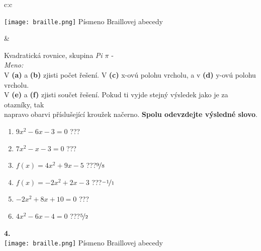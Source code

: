 \documentclass[10pt]{report}
\begin{document}
\begin{tabular}{c:c}
\begin{minipage}[c][99mm][t]{0.49\linewidth}
\begin{center}
\begin{minipage}{0.20\linewidth}
\begin{center}
\texttt{[image: braille.png]}
{\small Písmeno Braillovej abecedy}
\end{center}
\end{minipage}
\end{center}
\end{minipage}
&
\begin{minipage}[c][99mm][t]{0.49\linewidth}
\begin{center}
\vspace{7mm}
{\huge Kvadratická rovnice, skupina \textit{Pi $\pi$} -}\\[4.5mm]
\textit{Meno:}\phantom{xxxxxxxxxxxxxxxxxxxxxxxxxxxxxxxxxxxxxxxxxxxxxxxxxxxxxxxxxxxxxxxxx}\\[3.5mm]
V \textbf{(a)} a \textbf{(b)} zjisti počet řešení. V \textbf{(c)} x-ovú polohu vrcholu, a v \textbf{(d)} y-ovú polohu vrcholu.\\V \textbf{(e)} a \textbf{(f)} zjisti součet řešení. Pokud ti vyjde stejný výsledek jako je za otazníky, tak\\napravo obarvi příslušející kroužek načerno. \textbf{Spolu odevzdejte výsledné slovo}.\\[3mm]
\begin{minipage}{0.77\linewidth}
\begin{center}
\begin{varwidth}{\textwidth}
\begin{enumerate}
\large
\item $9x^2-6x-3=0$\quad \dotfill\; ???\;\dotfill {}
\item $7x^2-x-3=0$\quad \dotfill\; ???\;\dotfill {}
\item $f(x)=4x^2+9x-5$\quad \dotfill\; ???\;\dotfill \quad $\nicefrac{9}{8}$
\item $f(x)=-2x^2+2x-3$\quad \dotfill\; ???\;\dotfill \quad $\nicefrac{-1}{1}$
\item $-2x^2+8x+10=0$\quad \dotfill\; ???\;\dotfill {}
\item $4x^2-6x-4=0$\quad \dotfill\; ???\;\dotfill \quad $\nicefrac{5}{2}$
\end{enumerate}
\end{varwidth}
\end{center}
\end{minipage}
\begin{minipage}{0.20\linewidth}
\begin{center}
{\Huge\bfseries 4.} \\[2mm]
\texttt{[image: braille.png]}
{\small Písmeno Braillovej abecedy}
\end{center}
\end{minipage}
\end{center}
\end{minipage}

\end{tabular}
\end{document}

